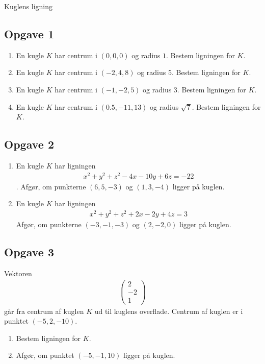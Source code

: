 \begin{center}
	\huge Kuglens ligning
\end{center}

\subsection*{Opgave 1}
\begin{enumerate}[label=\roman*)]
	\item En kugle $K$ har centrum i $(0,0,0)$ og radius $1$. Bestem ligningen for $K$. 
	\item En kugle $K$ har centrum i $(-2,4,8)$ og radius $5$. Bestem ligningen for $K$.
	\item En kugle $K$ har centrum i $(-1,-2,5)$ og radius $3$. Bestem ligningen for $K$.
	\item En kugle $K$ har centrum i $(0.5, -11, 13)$ og radius $\sqrt{7}$. Bestem ligningen for $K$. 
\end{enumerate}

\subsection*{Opgave 2}
\begin{enumerate}[label=\roman*)]
	\item En kugle $K$ har ligningen 
	\begin{align*}
		x^2 + y^2 + z^2 - 4x - 10y + 6z  = -22
	\end{align*}.
	Afgør, om punkterne $(6,5,-3)$ og $(1,3,-4)$ ligger på kuglen.
	\item En kugle $K$ har ligningen 
	\begin{align*}
		x^2 + y^2 + z^2 + 2x - 2y + 4z = 3
	\end{align*}	 
	Afgør, om punkterne $(-3, -1, -3)$ og $(2,-2,0)$ ligger på kuglen.
\end{enumerate}

\subsection*{Opgave 3}
Vektoren 
\begin{align*}
	\begin{pmatrix}
		2 \\ -2 \\ 1
	\end{pmatrix}
\end{align*}
går fra centrum af kuglen $K$ ud til kuglens overflade. Centrum af kuglen er i punktet $(-5,2,-10)$.
\begin{enumerate}[label=\roman*)]
	\item Bestem ligningen for $K$.
	\item Afgør, om punktet $(-5,-1,10)$ ligger på kuglen.
\end{enumerate}
\newpage
